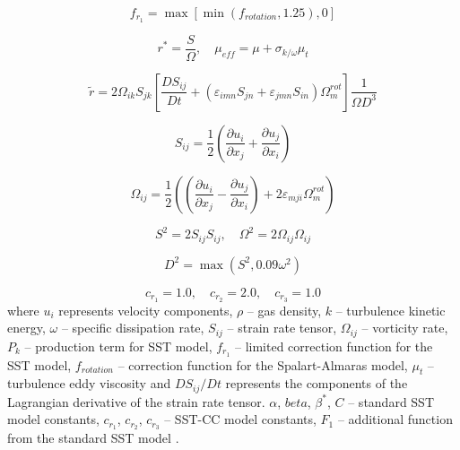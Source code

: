 \documentclass[a4paper]{jpconf}
\begin{document}
\begin{figure}[h]
\begin{minipage}{20pc}
\begin{equation}
f_{r_1} = \max\left[ \min(f_{rotation}, 1.25), 0 \right]
\end{equation}

\begin{equation}
r^*=\frac{S}{\Omega}, \quad \mu_{eff}=\mu + \sigma_{k/\omega}\mu_t
\end{equation}

\end{minipage}
\end{figure}
\begin{equation}
\tilde{r} = 2\Omega_{ik}S_{jk}\left[ \frac{DS_{ij}}{Dt} + \left( \varepsilon_{imn}S_{jn} + \varepsilon_{jmn}S_{in} \right)\Omega^{rot}_m \right]\frac{1}{\Omega D^3}
\end{equation}

 \begin{equation}
 S_{ij} = \frac{1}{2}\left( \frac{\partial u_i}{\partial x_j} + \frac{\partial u_j}{\partial x_i} \right)
 \end{equation}

\begin{equation}
\Omega_{ij} = \frac{1}{2}\left( \left( \frac{\partial u_i}{\partial x_j} - \frac{\partial u_j}{\partial x_i}  \right) +2\varepsilon_{mji} \Omega^{rot}_m \right)
\end{equation}

\begin{equation}
S^2 = 2S_{ij}S_{ij}, \quad 
\Omega^2 = 2\Omega_{ij}\Omega_{ij}
\end{equation}

\begin{equation}
D^2 = \max(S^2, 0.09\omega^2)
\end{equation}

$$
c_{r_1} = 1.0, \quad c_{r_2} = 2.0, \quad c_{r_3} = 1.0
$$
 where $u_i$ represents velocity components, $\rho$ -- gas density, $k$ -- turbulence kinetic energy, $\omega$ -- specific dissipation rate, $S_{ij}$ -- strain rate tensor, $\Omega_{ij}$ -- vorticity rate, $P_k$ -- production term for SST model, $f_{r_1}$ -- limited correction function for the SST model, $f_{rotation}$ -- correction function for the Spalart-Almaras model, $\mu_{t}$ -- turbulence eddy viscosity and $DS_{ij}/Dt$ represents the components of the Lagrangian derivative of the strain rate tensor. $\alpha$, $beta$, $\beta^*$, $C$ -- standard SST model constants, $c_{r_1}$, $c_{r_2}$, $c_{r_3}$ -- SST-CC model constants, $F_1$ -- additional function from the standard SST model \cite{Menter}.
\end{document}
